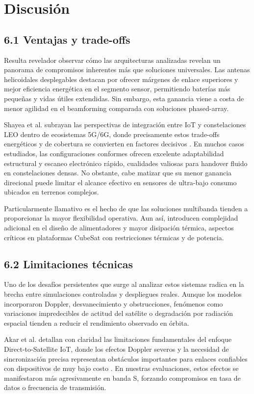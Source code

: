 \section{Discusión}

\subsection{6.1 Ventajas y trade-offs}

Resulta revelador observar cómo las arquitecturas analizadas revelan un panorama de compromisos inherentes más que soluciones universales. Las antenas helicoidales desplegables destacan por ofrecer márgenes de enlace superiores y mejor eficiencia energética en el segmento sensor, permitiendo baterías más pequeñas y vidas útiles extendidas. Sin embargo, esta ganancia viene a costa de menor agilidad en el beamforming comparada con soluciones phased-array.

Shayea et al. subrayan las perspectivas de integración entre IoT y constelaciones LEO dentro de ecosistemas 5G/6G, donde precisamente estos trade-offs energéticos y de cobertura se convierten en factores decisivos \cite{Shayea2024}. En muchos casos estudiados, las configuraciones conformes ofrecen excelente adaptabilidad estructural y escaneo electrónico rápido, cualidades valiosas para handover fluido en constelaciones densas. No obstante, cabe matizar que su menor ganancia direcional puede limitar el alcance efectivo en sensores de ultra-bajo consumo ubicados en terrenos complejos.

Particularmente llamativo es el hecho de que las soluciones multibanda tienden a proporcionar la mayor flexibilidad operativa. Aun así, introducen complejidad adicional en el diseño de alimentadores y mayor disipación térmica, aspectos críticos en plataformas CubeSat con restricciones térmicas y de potencia.

\subsection{6.2 Limitaciones técnicas}

Uno de los desafíos persistentes que surge al analizar estos sistemas radica en la brecha entre simulaciones controladas y despliegues reales. Aunque los modelos incorporaron Doppler, desvanecimiento y obstrucciones, fenómenos como variaciones impredecibles de actitud del satélite o degradación por radiación espacial tienden a reducir el rendimiento observado en órbita.

Akar et al. detallan con claridad las limitaciones fundamentales del enfoque Direct-to-Satellite IoT, donde los efectos Doppler severos y la necesidad de sincronización precisa representan obstáculos importantes para enlaces confiables con dispositivos de muy bajo costo \cite{Akar2026}. En nuestras evaluaciones, estos efectos se manifestaron más agresivamente en banda S, forzando compromisos en tasa de datos o frecuencia de transmisión.

